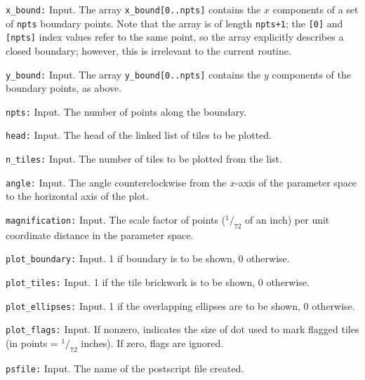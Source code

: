 \begin{description}
\item{\tt x\_bound:}
  Input.  The array {\tt x\_bound[0..npts]} contains the $x$
  components of a set of {\tt npts} boundary points.  Note that the
  array is of length {\tt npts+1}; the {\tt [0]} and {\tt [npts]}
  index values refer to the same point, so the array explicitly
  describes a closed boundary; however, this is irrelevant to the
  current routine.

\item{\tt y\_bound:}
  Input.  The array {\tt y\_bound[0..npts]} contains the $y$
  components of the boundary points, as above.

\item{\tt npts:}
  Input.  The number of points along the boundary.

\item{\tt head:}
  Input.  The head of the linked list of tiles to be plotted.

\item{\tt n\_tiles:}
  Input.  The number of tiles to be plotted from the list.

\item{\tt angle:}
  Input.  The angle counterclockwise from the $x$-axis of the
  parameter space to the horizontal axis of the plot.

\item{\tt magnification:}
  Input.  The scale factor of points (${}^1\!/_{72}$ of an inch) per
  unit coordinate distance in the parameter space.

\item{\tt plot\_boundary:}
  Input.  1 if boundary is to be shown, 0 otherwise.

\item{\tt plot\_tiles:}
  Input.  1 if the tile brickwork is to be shown, 0 otherwise.

\item{\tt plot\_ellipses:}
  Input.  1 if the overlapping ellipses are to be shown, 0 otherwise.

\item{\tt plot\_flags:}
  Input.  If nonzero, indicates the size of dot used to mark flagged
  tiles (in points = ${}^1\!/_{72}$ inches).  If zero, flags are
  ignored.

\item{\tt psfile:}
  Input.  The name of the postscript file created.

\end{description}

